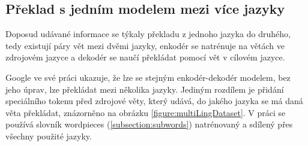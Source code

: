 \subsection{Překlad s jedním modelem mezi více jazyky}
Doposud udávané informace se týkaly překladu z jednoho jazyka do druhého, tedy existují páry vět mezi dvěmi jazyky, enkodér se natrénuje na větách ve zdrojovém jazyce a dekodér se naučí překládat pomocí vět v cílovém jazyce.

Google ve své práci \cite{googleMultiLingual} ukazuje, že lze se stejným enkodér-dekodér modelem, bez jeho úprav, lze překládat mezi několika jazyky.
Jediným rozdílem je přidání speciálního tokenu před zdrojové věty, který udává, do jakého jazyka se má daná věta překládat, znázorněno na obrázku \ref{figure:multiLingDataset}. V práci se používá slovník wordpieces (\ref{subsection:subwords}) natrénovaný a sdílený přes všechny použité jazyky.


